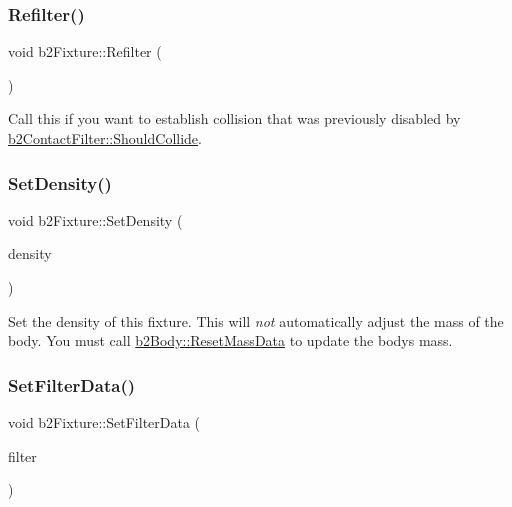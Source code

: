 \subsubsection{\texorpdfstring{Refilter()}{Refilter()}}
{\footnotesize\ttfamily void b2\+Fixture\+::\+Refilter (\begin{DoxyParamCaption}{ }\end{DoxyParamCaption})}



Call this if you want to establish collision that was previously disabled by \mbox{\hyperlink{classb2_contact_filter_aac8f6155d1f577d125db587f5269289b}{b2\+Contact\+Filter\+::\+Should\+Collide}}. 

\mbox{\label{classb2_fixture_ad4e1d9323103975c8931d022b952d04a}} 
\subsubsection{\texorpdfstring{SetDensity()}{SetDensity()}}
{\footnotesize\ttfamily void b2\+Fixture\+::\+Set\+Density (\begin{DoxyParamCaption}\item[{\mbox{\hyperlink{b2_settings_8h_aacdc525d6f7bddb3ae95d5c311bd06a1}{float32}}}]{density }\end{DoxyParamCaption})\hspace{0.3cm}{\ttfamily [inline]}}

Set the density of this fixture. This will {\itshape not} automatically adjust the mass of the body. You must call \mbox{\hyperlink{classb2_body_a109d8567c6ae84c61fce2919fb209c63}{b2\+Body\+::\+Reset\+Mass\+Data}} to update the body\textquotesingle{}s mass. \mbox{\label{classb2_fixture_a2c5e0d12c174927a4ad550459be334ad}} 
\subsubsection{\texorpdfstring{SetFilterData()}{SetFilterData()}}
{\footnotesize\ttfamily void b2\+Fixture\+::\+Set\+Filter\+Data (\begin{DoxyParamCaption}\item[{const \mbox{\hyperlink{structb2_filter}{b2\+Filter}} \&}]{filter }\end{DoxyParamCaption})}


